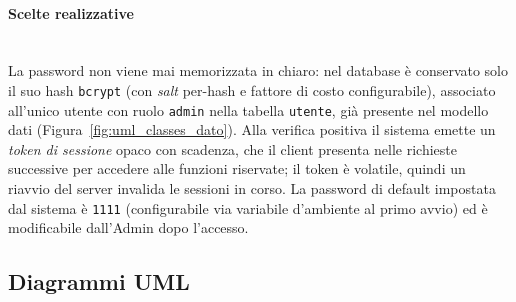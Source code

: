 \paragraph{Scelte realizzative}\mbox{}\\
La password non viene mai memorizzata in chiaro: nel database è conservato solo il
suo hash \texttt{bcrypt} (con \emph{salt} per-hash e fattore di costo
configurabile), associato all'unico utente con ruolo \texttt{admin} nella tabella
\texttt{utente}, già presente nel modello dati (Figura~\ref{fig:uml_classes_dato}).
Alla verifica positiva il sistema emette un \emph{token di sessione} opaco con
scadenza, che il client presenta nelle richieste successive per accedere alle
funzioni riservate; il token è volatile, quindi un riavvio del server invalida le
sessioni in corso. La password di default impostata dal sistema è \texttt{1111}
(configurabile via variabile d'ambiente al primo avvio) ed è modificabile
dall'Admin dopo l'accesso.

\newpage
\subsection{Diagrammi UML}

